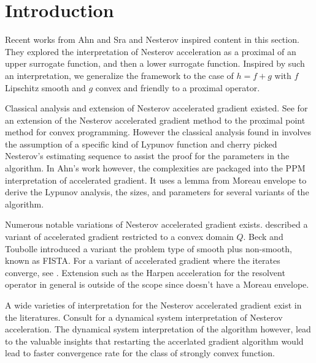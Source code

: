 \documentclass[12pt]{article}
\begin{document}
\section{Introduction}
    Recent works from Ahn and Sra \cite{ahn_understanding_2022} and Nesterov \cite{nesterov_lectures_2018} inspired content in this section.
    They explored the interpretation of Nesterov acceleration as a proximal of an upper surrogate function, and then a lower surrogate function. 
    Inspired by such an interpretation, we generalize the framework to the case of $h = f + g$ with $f$ Lipschitz smooth and $g$ convex and friendly to a proximal operator. 
    \par
    Classical analysis and extension of Nesterov accelerated gradient existed. 
    See \cite*{guler_new_1992} for an extension of the Nesterov accelerated gradient method to the proximal point method for convex programming. 
    However the classical analysis found in \cite*[chapter 2]{nesterov_lectures_2018} involves the assumption of a specific kind of Lypunov function and cherry picked Nesterov's estimating sequence to assist the proof for the parameters in the algorithm. 
    In Ahn's work however, the complexities are packaged into the PPM interpretation of accelerated gradient. 
    It uses a lemma from Moreau envelope to derive the Lypunov analysis, the sizes, and parameters for several variants of the algorithm. 
    \par
    Numerous notable variations of Nesterov accelerated gradient exists. \cite*[(6.1.19)]{nesterov_lectures_2018} described a variant of accelerated gradient restricted to a convex domain $Q$. 
    Beck and Toubolle \cite{beck_fast_2009} introduced a variant the problem type of smooth plus non-smooth, known as FISTA. 
    For a variant of accelerated gradient where the iterates converge, see \cite{chambolle_convergence_2015}. 
    Extension such as the Harpen acceleration for the resolvent operator in general is outside of the scope since doesn't have a Moreau envelope. 
    \par
    A wide varieties of interpretation for the Nesterov accelerated gradient exist in the literatures. 
    Consult \cite{su_differential_2015} for a dynamical system interpretation of Nesterov acceleration. 
    The dynamical system interpretation of the algorithm however, lead to the valuable insights that restarting the accerlated gradient algorithm would lead to faster convergence rate for the class of strongly convex function. 
    \par
    
\end{document}
